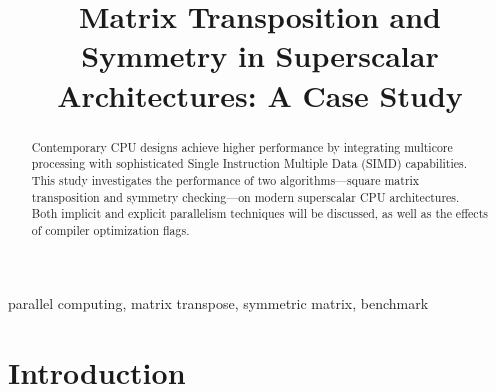 \documentclass[conference]{IEEEtran}
\begin{document}
\title{Matrix Transposition and Symmetry in Superscalar Architectures: A Case Study\\
}

\author{
}

\maketitle


\begin{abstract}
Contemporary CPU designs achieve higher performance by integrating multicore processing with sophisticated Single Instruction Multiple Data (SIMD) capabilities.
This study investigates the performance of two algorithms—square matrix transposition and symmetry checking—on modern superscalar CPU architectures. Both implicit and explicit parallelism techniques will be discussed, as well as the effects of compiler optimization flags.
\end{abstract}

\begin{IEEEkeywords}
parallel computing, matrix transpose, symmetric matrix, benchmark
\end{IEEEkeywords}

\section{Introduction}
\end{document}
